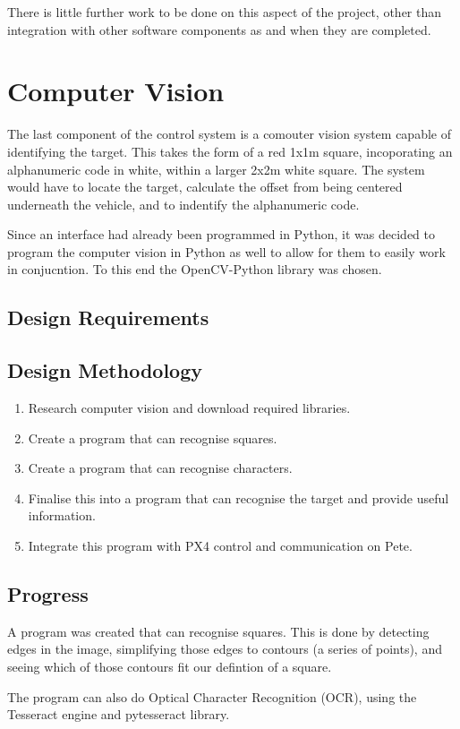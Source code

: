 \documentclass[10pt]{article}
\begin{document}
There is little further work to be done on this aspect of the project, other than integration with other software components as and when they are completed.

\section{Computer Vision}
The last component of the control system is a comouter vision system capable of identifying the target. This takes the form of a red 1x1m square, incoporating an alphanumeric code in white, within a larger 2x2m white square\cite{IMechE_rules}. The system would have to locate the target, calculate the offset from being centered underneath the vehicle, and to indentify the alphanumeric code.

Since an interface had already been programmed in Python, it was decided to program the computer vision in Python as well to allow for them to easily work in conjucntion. To this end the OpenCV-Python library was chosen.
\subsection{Design Requirements}
\subsection{Design Methodology}
\begin{enumerate}
    \item Research computer vision and download required libraries.
    \item Create a program that can recognise squares.
    \item Create a program that can recognise characters.
    \item Finalise this into a program that can recognise the target and provide useful information.
    \item Integrate this program with PX4 control and communication on Pete.
\end{enumerate}
\subsection{Progress}
A program was created that can recognise squares. This is done by detecting edges in the image, simplifying those edges to contours (a series of points), and seeing which of those contours fit our defintion of a square.

The program can also do Optical Character Recognition (OCR), using the Tesseract engine and pytesseract library.
\end{document}
